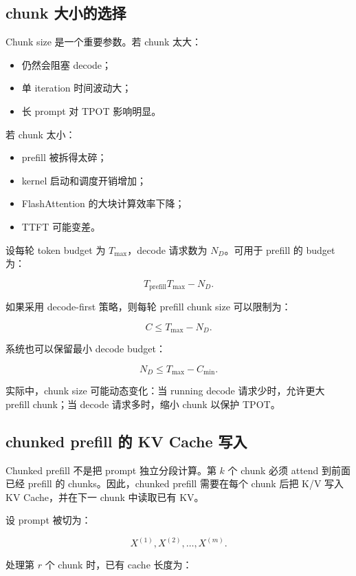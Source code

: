 \subsection{chunk 大小的选择}
\label{subsec:chunk-size-choice}

Chunk size 是一个重要参数。若 chunk 太大：

\begin{itemize}
\item 仍然会阻塞 decode；
\item 单 iteration 时间波动大；
\item 长 prompt 对 TPOT 影响明显。
\end{itemize}

若 chunk 太小：

\begin{itemize}
\item prefill 被拆得太碎；
\item kernel 启动和调度开销增加；
\item FlashAttention 的大块计算效率下降；
\item TTFT 可能变差。
\end{itemize}

设每轮 token budget 为 $T_{\max}$，decode 请求数为 $N_D$。可用于 prefill 的 budget 为：

\[
T_{\mathrm{prefill}}
T_{\max}-N_D.
\]

如果采用 decode-first 策略，则每轮 prefill chunk size 可以限制为：

\[
C
\le
T_{\max}-N_D.
\]

系统也可以保留最小 decode budget：

\[
N_D
\le
T_{\max}-C_{\min}.
\]

实际中，chunk size 可能动态变化：当 running decode 请求少时，允许更大 prefill chunk；当 decode 请求多时，缩小 chunk 以保护 TPOT。

\subsection{chunked prefill 的 KV Cache 写入}
\label{subsec:chunked-prefill-kv-write}

Chunked prefill 不是把 prompt 独立分段计算。第 $k$ 个 chunk 必须 attend 到前面已经 prefill 的 chunks。因此，chunked prefill 需要在每个 chunk 后把 K/V 写入 KV Cache，并在下一 chunk 中读取已有 KV。

设 prompt 被切为：

\[
X^{(1)},X^{(2)},\ldots,X^{(m)}.
\]

处理第 $r$ 个 chunk 时，已有 cache 长度为：

